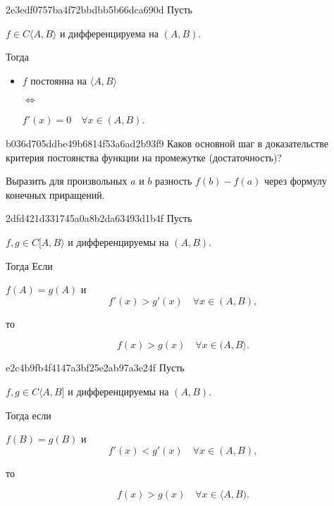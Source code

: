\begin{note}{2e3edf0757ba4f72bbdbb5b66dca690d}
    Пусть \begin{icloze}{4}\( f \in C\langle A, B \rangle  \) и дифференцируема на \( (A, B) \).\end{icloze} Тогда
    \begin{itemize}
        \item {}\begin{icloze}{2}\( f \) постоянна на \( \langle A, B \rangle  \)\end{icloze}
            \begin{icloze}{3}\( \iff  \)\end{icloze}
            \begin{icloze}{1}\( f'(x) = 0 \quad \forall x \in (A, B) \).\end{icloze}
    \end{itemize}
\end{note}

\begin{note}{b036d705ddbe49b6814f53a6ad2b93f9}
    Каков основной шаг в доказательстве критерия постоянства функции на промежутке (достаточность)?

    \begin{cloze}{1}
        Выразить для произвольных \( a \) и \( b \) разность \( f(b) - f(a) \) через формулу конечных приращений.
    \end{cloze}
\end{note}

\begin{note}{2dfd421d331745a0a8b2da63493d1b4f}
    Пусть \begin{icloze}{3}\( f, g \in C[A, B\rangle \) и дифференцируемы на \( (A,  B) \).\end{icloze} Тогда
    Если \begin{icloze}{2}\( f(A) = g(A) \) и
        \[
            f'(x) > g'(x) \quad \forall x \in (A, B),
        \]
    \end{icloze}    то
    \begin{icloze}{1}\[
        f(x) > g(x) \quad \forall x \in (A, B\rangle.
    \]\end{icloze}
\end{note}

\begin{note}{e2c4b9fb4f4147a3bf25e2ab97a3e24f}
    Пусть \begin{icloze}{3}\( f, g \in C \langle A, B] \) и дифференцируемы на \( (A,  B) \).\end{icloze}
    Тогда если \begin{icloze}{2}\( f(B) = g(B) \) и
        \[
            f'(x) < g'(x) \quad \forall x \in (A, B),
        \]
    \end{icloze}    то
    \begin{icloze}{1}\[
        f(x) > g(x) \quad \forall x \in \langle A, B).
    \]\end{icloze}
\end{note}

